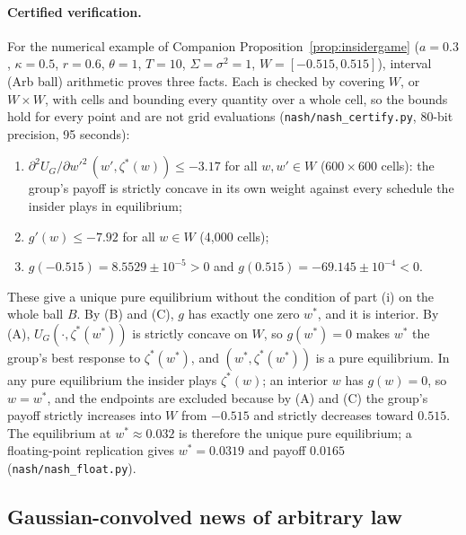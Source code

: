 \documentclass[12pt]{article}
\theoremstyle{definition}
\theoremstyle{remark}
\begin{document}
\paragraph{Certified verification.} For the numerical example of Companion Proposition~\ref{prop:insidergame} ($a=0.3$, $\kappa=0.5$, $r=0.6$, $\theta=1$, $T=10$, $\Sigma=\sigma^2=1$, $W=[-0.515,0.515]$), interval (Arb ball) arithmetic proves three facts. Each is checked by covering $W$, or $W\times W$, with cells and bounding every quantity over a whole cell, so the bounds hold for every point and are not grid evaluations (\nolinkurl{nash/nash_certify.py}, 80-bit precision, 95 seconds):
\begin{enumerate}[label=(\Alph*),itemsep=1pt]
\item $\partial^2U_G/\partial w'^2\,(w',\zeta^*(w))\le-3.17$ for all $w,w'\in W$ ($600\times600$ cells): the group's payoff is strictly concave in its own weight against every schedule the insider plays in equilibrium;
\item $g'(w)\le-7.92$ for all $w\in W$ (4,000 cells);
\item $g(-0.515)=8.5529\pm10^{-5}>0$ and $g(0.515)=-69.145\pm10^{-4}<0$.
\end{enumerate}
These give a unique pure equilibrium without the condition of part (i) on the whole ball $B$. By (B) and (C), $g$ has exactly one zero $w^*$, and it is interior. By (A), $U_G(\cdot,\zeta^*(w^*))$ is strictly concave on $W$, so $g(w^*)=0$ makes $w^*$ the group's best response to $\zeta^*(w^*)$, and $(w^*,\zeta^*(w^*))$ is a pure equilibrium. In any pure equilibrium the insider plays $\zeta^*(w)$; an interior $w$ has $g(w)=0$, so $w=w^*$, and the endpoints are excluded because by (A) and (C) the group's payoff strictly increases into $W$ from $-0.515$ and strictly decreases toward $0.515$. The equilibrium at $w^*\approx0.032$ is therefore the unique pure equilibrium; a floating-point replication gives $w^*=0.0319$ and payoff $0.0165$ (\nolinkurl{nash/nash_float.py}).

\subsection{Gaussian-convolved news of arbitrary law}\label{app:convolvednews}\label{app:convexdealer}
\end{document}
